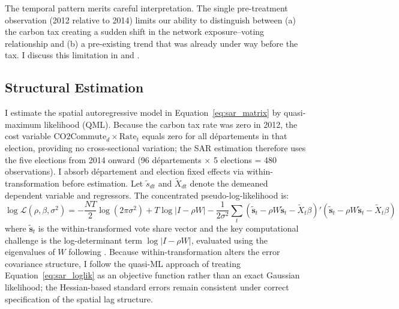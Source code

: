\documentclass[12pt]{article}
\newcommand{\dept}{d\'{e}partement}
\newcommand{\depts}{d\'{e}partements}
\begin{document}
The temporal pattern merits careful interpretation. The single pre-treatment observation (2012 relative to 2014) limits our ability to distinguish between (a) the carbon tax creating a sudden shift in the network exposure--voting relationship and (b) a pre-existing trend that was already under way before the tax. I discuss this limitation in  and .

\subsection{Structural Estimation}

I estimate the spatial autoregressive model in Equation~\ref{eq:sar_matrix} by quasi-maximum likelihood (QML). Because the carbon tax rate was zero in 2012, the cost variable $\text{CO2Commute}_d \times \text{Rate}_t$ equals zero for all \depts{} in that election, providing no cross-sectional variation; the SAR estimation therefore uses the five elections from 2014 onward (96 \depts{} $\times$ 5 elections = 480 observations). I absorb \dept{} and election fixed effects via within-transformation before estimation. Let $\tilde{s}_{dt}$ and $\tilde{X}_{dt}$ denote the demeaned dependent variable and regressors. The concentrated pseudo-log-likelihood is:
\begin{equation}
\log \mathcal{L}(\rho, \beta, \sigma^2) = -\frac{NT}{2} \log(2\pi\sigma^2) + T \log |I - \rho W| - \frac{1}{2\sigma^2} \sum_t (\tilde{\mathbf{s}}_t - \rho W \tilde{\mathbf{s}}_t - \tilde{X}_t\beta)'(\tilde{\mathbf{s}}_t - \rho W \tilde{\mathbf{s}}_t - \tilde{X}_t\beta)
\label{eq:sar_loglik}
\end{equation}
where $\tilde{\mathbf{s}}_t$ is the within-transformed vote share vector and the key computational challenge is the log-determinant term $\log |I - \rho W|$, evaluated using the eigenvalues of $W$ following \citet{lee2004asymptotic}. Because within-transformation alters the error covariance structure, I follow the quasi-ML approach of treating Equation~\ref{eq:sar_loglik} as an objective function rather than an exact Gaussian likelihood; the Hessian-based standard errors remain consistent under correct specification of the spatial lag structure.
\end{document}
